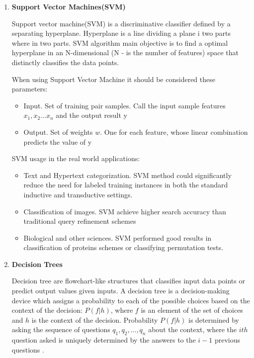 \begin{enumerate}
\begin{enumerate}
    \end{enumerate}
    \item \textbf{Support Vector Machines(SVM)} 
    
    Support vector machine(SVM) is a discriminative classifier defined by a separating hyperplane. Hyperplane is a line dividing a plane i two parts where in two parts. SVM algorithm main objective is to find a optimal hyperplane in an N-dimensional (N - is the number of features) space that distinctly classifies the data points. 
    
    When using Support Vector Machine it should be considered these parameters:
    
    \begin{itemize}
        \item Input. Set of training pair samples. Call the input sample features $x_{1}, x_{2}...x_{n}$ and the output result y
        \item Output. Set of weights $w$. One for each feature, whose linear combination predicts the value of y
    \end{itemize}
    
    
    
    SVM usage in the real world applications:
    
    \begin{itemize}
        \item Text and Hypertext categorization. SVM method could significantly reduce the need for labeled training instances in both the standard inductive and transductive settings.
        \item Classification of images. SVM achieve higher search accuracy than traditional query refinement schemes
        \item Biological and other sciences. SVM performed good results in classification of proteins schemes or classifying permutation tests.
    \end{itemize}
    
    
    \item \textbf{Decision Trees}
    
    Decision tree are flowchart-like structures that classifies input data points or predict output values given inputs.
    A decision tree is a decision-making device which assigns a probability to each of the possible choices based on the context of the decision: $P(f|h)$, where $f$ is an element of the set of choices and $h$ is the context of the decision. Probability $P(f|h)$ is determined by asking the sequence of questions $q_{1}, q_{2},...,q_{n}$ about the context, where the $ith$ question asked is uniquely determined by the answers to the $i - 1$ previous questions \cite{BIB5}.
    

\end{enumerate}
